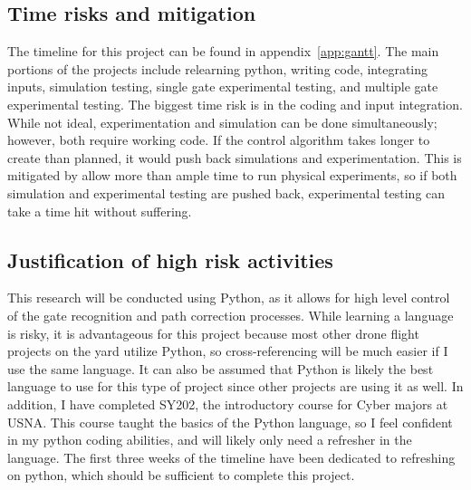 \documentclass[onecolumn,10pt]{IEEEtran}
\begin{document}



\subsection{Time risks and mitigation}
The timeline for this project can be found in appendix~\ref{app:gantt}. The main portions of the projects include relearning python, writing code, integrating inputs, simulation testing, single gate experimental testing, and multiple gate experimental testing. The biggest time risk is in the coding and input integration. While not ideal, experimentation and simulation can be done simultaneously; however, both require working code. If the control algorithm takes longer to create than planned, it would push back simulations and experimentation. This is mitigated by allow more than ample time to run physical experiments, so if both simulation and experimental testing are pushed back, experimental testing can take a time hit without suffering.



\subsection{Justification of high risk activities}
This research will be conducted using Python, as it allows for high level control of the gate recognition and path correction processes. While learning a language is risky, it is advantageous for this project because most other drone flight projects on the yard utilize Python, so cross-referencing will be much easier if I use the same language. It can also be assumed that Python is likely the best language to use for this type of project since other projects are using it as well. In addition, I have completed SY202, the introductory course for Cyber majors at USNA. This course taught the basics of the Python language, so I feel confident in my python coding abilities, and will likely only need a refresher in the language. The first three weeks of the timeline have been dedicated to refreshing on python, which should be sufficient to complete this project.
\end{document}
